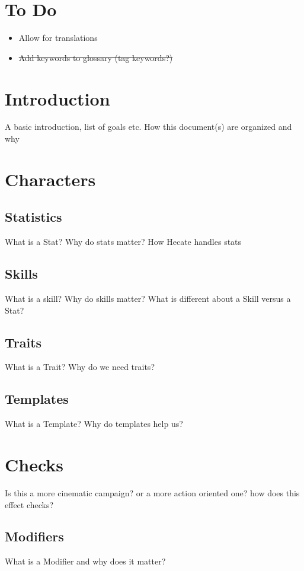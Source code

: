 \documentclass{article}
\begin{document}
\section{To Do}
\begin{itemize}
	\item Allow for translations
	\item \sout{Add keywords to glossary (tag keywords?)}
\end{itemize}

\section{Introduction}
A basic introduction, list of goals etc. How this document(s) are organized and why


\section{Characters}

\subsection{Statistics}
What is a Stat? Why do stats matter? How Hecate handles stats

\subsection{Skills}
What is a skill? Why do skills matter? What is different about a Skill versus a Stat?

\subsection{Traits}
What is a Trait? Why do we need traits?

\subsection{Templates}
What is a Template? Why do templates help us?


\section{Checks}
Is this a more cinematic campaign? or a more action oriented one? how does this effect checks?

\subsection{Modifiers}
What is a Modifier and why does it matter?
\end{document}
